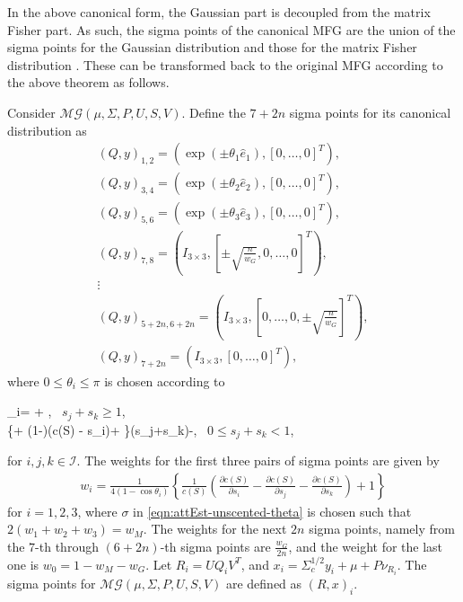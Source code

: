 In the above canonical form, the Gaussian part is decoupled from the matrix Fisher part. 
As such, the sigma points of the canonical MFG are the union of the sigma points for the Gaussian distribution and those for the matrix Fisher distribution \cite{lee2018bayesian}.
These can be transformed back to the original MFG according to the above theorem as follows.

\begin{definition} \label{def:MFG-sigmaPoints}
	Consider $\mathcal{MG}(\mu,\Sigma,P,U,S,V)$.
	Define the $7+2n$ sigma points for its canonical distribution as
	\begin{gather} \label{eqn:attEst-unscented-sigmaPoints}
		({Q},y)_{1,2} = \left(\exp(\pm\theta_1\hat{e}_1),[0,\ldots,0]^T\right), \nonumber \\
		({Q},y)_{3,4} = \left(\exp(\pm\theta_2\hat{e}_2),[0,\ldots,0]^T\right), \nonumber \\
		({Q},y)_{5,6} = \left(\exp(\pm\theta_3\hat{e}_3),[0,\ldots,0]^T\right), \nonumber \\
		({Q},y)_{7,8} = \left(I_{3\times3},\left[\pm\sqrt{\frac{n}{w_G}},0,\ldots,0\right]^T\right), \nonumber \\
		\vdots \nonumber \\
		({Q},y)_{5+2n,6+2n} = \left(I_{3\times3},\left[0,\ldots,0,\pm\sqrt{\frac{n}{w_G}}\right]^T\right), \nonumber \\
		({Q},y)_{7+2n} = \left(I_{3\times3},[0,\ldots,0]^T\right),
	\end{gather}
	where $0\leq \theta_i\leq \pi$ is chosen according to
	\begin{subnumcases}{\cos\theta_i= \label{eqn:attEst-unscented-theta}}
		\sigma + ,\; \mbox{  $s_j+s_k\geq 1$},\\
		\left\{\sigma + (1-\sigma)(\log c(S) - s_i)+ \right\}(s_j+s_k)-,\; \mbox{  $0\leq s_j+s_k < 1$,}
	\end{subnumcases}
	for $i,j,k\in\mathcal{I}$.
	The weights for the first three pairs of sigma points are given by
	\begin{align}
		w_i = \frac{1}{4(1-\cos\theta_i)}\left\{\frac{1}{c(S)}\left(\frac{\partial c(S)}{\partial s_i}-\frac{\partial c(S)}{\partial s_j}-\frac{\partial c(S)}{\partial s_k}\right)+1\right\}
	\end{align}
	for $i=1,2,3$, where $\sigma$ in \eqref{eqn:attEst-unscented-theta} is chosen such that $2(w_1+w_2+w_3)=w_M$.
	The weights for the next $2n$ sigma points, namely from the $7$-th through $(6+2n)$-th sigma points are $\frac{w_G}{2n}$, and the weight for the last one is $w_0=1-w_M-w_G$.
	Let $R_i = U{Q}_iV^T$, and $x_i=\Sigma_c^{1/2}y_i+\mu+P\nu_{R_i}$.
	The sigma points for $\mathcal{MG}(\mu,\Sigma,P,U,S,V)$ are defined as $(R,x)_i$.
\end{definition}

